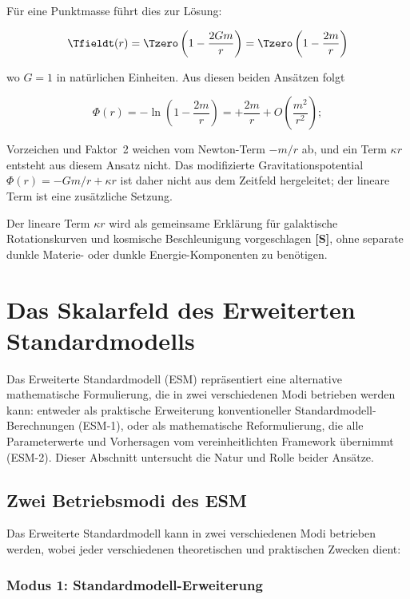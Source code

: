 	Für eine Punktmasse führt dies zur Lösung:
	
	\begin{equation}
		\Tfieldt(r) = \Tzero\left(1 - \frac{2Gm}{r}\right) = \Tzero\left(1 - \frac{2m}{r}\right)
	\end{equation}
	
	wo $G = 1$ in natürlichen Einheiten. Aus diesen beiden Ansätzen folgt
	
	\begin{equation}
		\Phi(r) = -\ln\left(1 - \frac{2m}{r}\right) = +\frac{2m}{r} + O\!\left(\frac{m^2}{r^2}\right);
	\end{equation}
	
	Vorzeichen und Faktor~2 weichen vom Newton-Term $-m/r$ ab, und ein Term $\kappa r$ entsteht aus diesem Ansatz nicht. Das modifizierte Gravitationspotential $\Phi(r) = -Gm/r + \kappa r$ ist daher nicht aus dem Zeitfeld hergeleitet; der lineare Term ist eine zusätzliche Setzung.
	
	Der lineare Term $\kappa r$ wird als gemeinsame Erklärung für galaktische Rotationskurven und kosmische Beschleunigung vorgeschlagen \textbf{[S]}, ohne separate dunkle Materie- oder dunkle Energie-Komponenten zu benötigen.
	
	\section{Das Skalarfeld des Erweiterten Standardmodells}
	\label{sec:esm_scalar_field}
	
	Das Erweiterte Standardmodell (ESM) repräsentiert eine alternative mathematische Formulierung, die in zwei verschiedenen Modi betrieben werden kann: entweder als praktische Erweiterung konventioneller Standardmodell-Berechnungen (ESM-1), oder als mathematische Reformulierung, die alle Parameterwerte und Vorhersagen vom vereinheitlichten Framework übernimmt (ESM-2). Dieser Abschnitt untersucht die Natur und Rolle beider Ansätze.
	
	\subsection{Zwei Betriebsmodi des ESM}
	\label{subsec:two_operational_modes}
	
	Das Erweiterte Standardmodell kann in zwei verschiedenen Modi betrieben werden, wobei jeder verschiedenen theoretischen und praktischen Zwecken dient:
	
	\subsubsection{Modus 1: Standardmodell-Erweiterung}
	\label{subsubsec:mode1_sm_extension}
	
